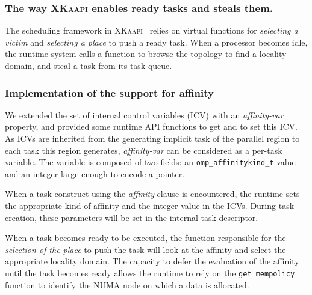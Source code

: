 \documentclass{Styles/llncs}
\newcommand{\kaapi}{\textsc{\mbox{XKaapi}}\xspace}
\newcommand{\TG}[1]{{\color{red}\bfseries TG: #1}}
\begin{document}
\subsubsection{The way \kaapi enables ready tasks and steals them.}

The scheduling framework in \kaapi~\cite{Bleuse2014,parco2015} relies on virtual functions
for \textit{selecting a victim} and \textit{selecting a place} to push a ready task.
When a processor becomes idle, the runtime system calls a function to browse the topology to find a locality domain, and steal a task from its task queue.

\subsubsection{Implementation of the support for affinity}
We extended the set of internal control variables (ICV) with an \textit{affinity-var} property, and provided some runtime API functions to get and to set this ICV. As ICVs are inherited from the generating implicit task of the parallel region to each task this region generates, \textit{affinity-var} can be considered as a per-task variable. The variable is composed of two fields: an \texttt{omp\_affinitykind\_t} value and an integer large enough to encode a pointer.


When a task construct using the \textit{affinity} clause is encountered, the runtime sets the appropriate kind of affinity and the integer value in the ICVs.
During task creation, these parameters will be set in the internal task descriptor.

When a task becomes ready to be executed, the function responsible for the \textit{selection of the place} to push
the task will look at the affinity and select the appropriate locality domain. The capacity to defer the evaluation of the affinity until the task becomes ready allows the runtime to rely on the \verb/get_mempolicy/ function to identify the NUMA node on which a data is allocated.
\end{document}
